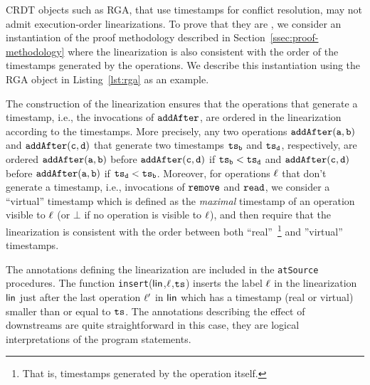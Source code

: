 CRDT objects such as RGA, that use timestamps for conflict resolution, may not admit execution-order linearizations. 
To prove that they are \crdtlinearizable{}, we consider an instantiation of the proof methodology described in Section~\ref{ssec:proof-methodology} where the linearization is also consistent with the order of the timestamps generated by the operations.
We describe this instantiation using the RGA object in Listing~\ref{lst:rga} as an example.

The construction of the linearization ensures that the operations that generate a timestamp, i.e., the invocations of ${\tt addAfter}$, are ordered in the linearization according to the timestamps. More precisely, any two operations $\alabelshort[{\tt addAfter}]{a,b}$ and $\alabelshort[{\tt addAfter}]{c,d}$ that generate two timestamps $\mathtt{ts}_{\tt b}$ and $\mathtt{ts}_{\tt d}$, respectively, are ordered $\alabelshort[{\tt addAfter}]{a,b}$ before $\alabelshort[{\tt addAfter}]{c,d}$ if $\mathtt{ts}_{\tt b}<\mathtt{ts}_{\tt d}$ and $\alabelshort[{\tt addAfter}]{c,d}$ before $\alabelshort[{\tt addAfter}]{a,b}$ if $\mathtt{ts}_{\tt d}<\mathtt{ts}_{\tt b}$. Moreover, for operations $\ell$ that don't generate a timestamp, i.e., invocations of ${\tt remove}$ and ${\tt read}$, we consider a ``virtual'' timestamp which is defined as the \emph{maximal} timestamp of an operation visible to $\ell$ (or $\bot$ if no operation is visible to $\ell$), and then require that the linearization is consistent with the order between both ``real''~\footnote{That is, timestamps generated by the operation itself.} and ''virtual'' timestamps. 

The annotations defining the linearization are included in the \lstinline|atSource| procedures. The function {\tt insert}($\mathsf{lin}$,$\ell$,$\mathtt{ts}$) inserts the label $\ell$ in the linearization $\mathsf{lin}$ just after the last operation $\ell'$ in $\mathsf{lin}$ which has a timestamp (real or virtual) smaller than or equal to $\mathtt{ts}$. The annotations describing the effect of downstreams are quite straightforward in this case, they are logical interpretations of the program statements.


